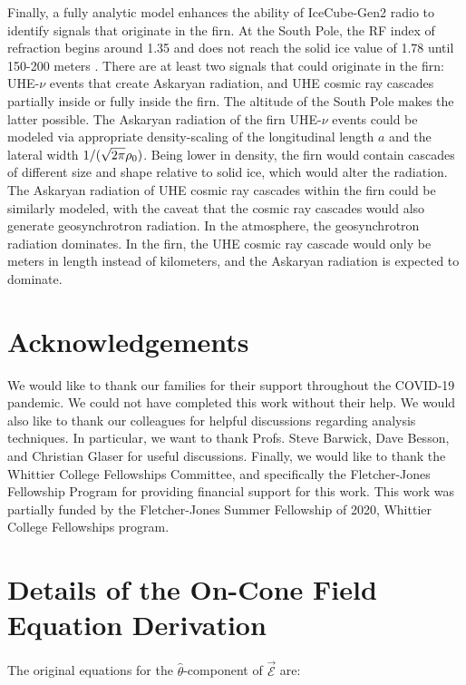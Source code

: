 \documentclass[amsmath,amssymb,aps,prd,10pt,twocolumn]{revtex4}
\begin{document}
Finally, a fully analytic model enhances the ability of IceCube-Gen2 radio to identify signals that originate in the firn.  At the South Pole, the RF index of refraction begins around 1.35 and does not reach the solid ice value of 1.78 until 150-200 meters \cite{Barwick:2018497}.  There are at least two signals that could originate in the firn: UHE-$\nu$ events that create Askaryan radiation, and UHE cosmic ray cascades partially inside or fully inside the firn.  The altitude of the South Pole makes the latter possible.  The Askaryan radiation of the firn UHE-$\nu$ events could be modeled via appropriate density-scaling of the longitudinal length $a$ and the lateral width $1/(\sqrt{2\pi} \rho_{\rm 0})$.  Being lower in density, the firn would contain cascades of different size and shape relative to solid ice, which would alter the radiation.  The Askaryan radiation of UHE cosmic ray cascades within the firn could be similarly modeled, with the caveat that the cosmic ray cascades would also generate geosynchrotron radiation.  In the atmosphere, the geosynchrotron radiation dominates.  In the firn, the UHE cosmic ray cascade would only be meters in length instead of kilometers, and the Askaryan radiation is expected to dominate.

\section{Acknowledgements}

We would like to thank our families for their support throughout the COVID-19 pandemic.  We could not have completed this work without their help.  We would also like to thank our colleagues for helpful discussions regarding analysis techniques.  In particular, we want to thank Profs. Steve Barwick, Dave Besson, and Christian Glaser for useful discussions.  Finally, we would like to thank the Whittier College Fellowships Committee, and specifically the Fletcher-Jones Fellowship Program for providing financial support for this work.  This work was partially funded by the Fletcher-Jones Summer Fellowship of 2020, Whittier College Fellowships program.

\appendix

\section{Details of the On-Cone Field Equation Derivation}
\label{app:a}

The original equations for the $\hat{\theta}$-component of $\vec{\mathcal{E}}$ are:
\end{document}
